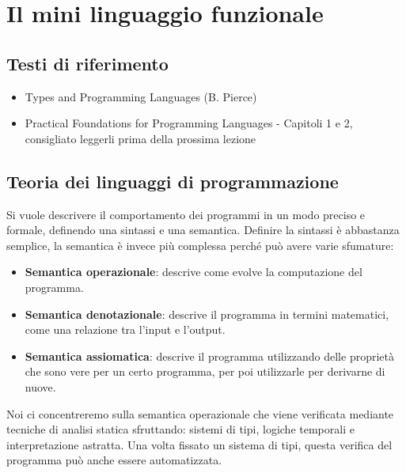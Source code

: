 

\chapter{Il mini linguaggio funzionale}

\section*{Testi di riferimento}

\begin{itemize}
	\item Types and Programming Languages (B. Pierce) 
	\item Practical Foundations for Programming Languages - Capitoli 1 e 2, consigliato leggerli prima della prossima lezione
\end{itemize}

\section{Teoria dei linguaggi di programmazione}

Si vuole descrivere il comportamento dei programmi in un modo preciso e formale, definendo una sintassi e una semantica.
Definire la sintassi è abbastanza semplice, la semantica è invece più complessa perché può avere varie sfumature:

\begin{itemize}
	\item \textbf{Semantica operazionale}: descrive come evolve la computazione del programma.
	\item \textbf{Semantica denotazionale}: descrive il programma in termini matematici, come una relazione tra l'input e l'output.
	\item \textbf{Semantica assiomatica}: descrive il programma utilizzando delle proprietà che sono vere per un certo programma, per poi utilizzarle per derivarne di nuove.
\end{itemize}

\noindent Noi ci concentreremo sulla semantica operazionale che viene verificata mediante tecniche di analisi statica sfruttando: sistemi di tipi, logiche temporali e interpretazione astratta.
Una volta fissato un sistema di tipi, questa verifica del programma può anche essere automatizzata.

